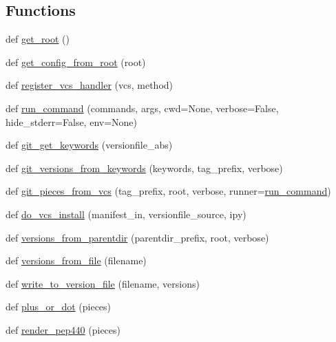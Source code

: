 \subsection*{Functions}
\begin{DoxyCompactItemize}
\item 
def \hyperlink{namespaceversioneer_a32e3afb612d9def7b20a3529c118eaac}{get\+\_\+root} ()
\item 
def \hyperlink{namespaceversioneer_a754a5133f3e3c7b19f27c9ce2e32a2b3}{get\+\_\+config\+\_\+from\+\_\+root} (root)
\item 
def \hyperlink{namespaceversioneer_a5573fabc5582faade41a6365347777aa}{register\+\_\+vcs\+\_\+handler} (vcs, method)
\item 
def \hyperlink{namespaceversioneer_a89717690f70ee308e16baf071b4b81da}{run\+\_\+command} (commands, args, cwd=None, verbose=False, hide\+\_\+stderr=False, env=None)
\item 
def \hyperlink{namespaceversioneer_ad2a709a90be7e4f03fb64ec28c9cad89}{git\+\_\+get\+\_\+keywords} (versionfile\+\_\+abs)
\item 
def \hyperlink{namespaceversioneer_a7db6b5bc705d0a8348c3e232df1d900d}{git\+\_\+versions\+\_\+from\+\_\+keywords} (keywords, tag\+\_\+prefix, verbose)
\item 
def \hyperlink{namespaceversioneer_a6e36c114ba80f100db2b81427ce08dd2}{git\+\_\+pieces\+\_\+from\+\_\+vcs} (tag\+\_\+prefix, root, verbose, runner=\hyperlink{namespaceversioneer_a89717690f70ee308e16baf071b4b81da}{run\+\_\+command})
\item 
def \hyperlink{namespaceversioneer_a4b46348d81ccd33c835bccbb2cbabd8a}{do\+\_\+vcs\+\_\+install} (manifest\+\_\+in, versionfile\+\_\+source, ipy)
\item 
def \hyperlink{namespaceversioneer_a5ee38b3172cec8bf4720b1bbbf575f89}{versions\+\_\+from\+\_\+parentdir} (parentdir\+\_\+prefix, root, verbose)
\item 
def \hyperlink{namespaceversioneer_a9051a0212036ae5199c90d8d8b9a5710}{versions\+\_\+from\+\_\+file} (filename)
\item 
def \hyperlink{namespaceversioneer_aac07ed00639b610d88bdfc030b3dcb86}{write\+\_\+to\+\_\+version\+\_\+file} (filename, versions)
\item 
def \hyperlink{namespaceversioneer_ae3c26ab2721af61ccd87516c65d8923a}{plus\+\_\+or\+\_\+dot} (pieces)
\item 
def \hyperlink{namespaceversioneer_ab8f2f6a39b1c282abdee3f449ed023a9}{render\+\_\+pep440} (pieces)
\item 

\end{DoxyCompactItemize}
